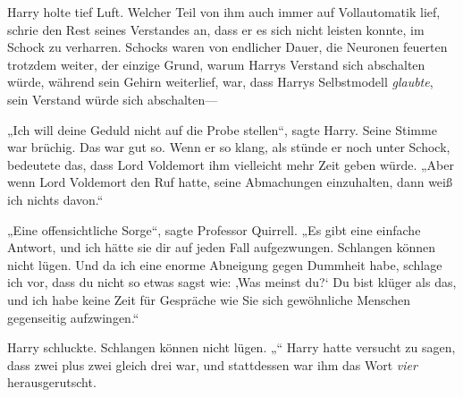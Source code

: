 Harry holte tief Luft. Welcher Teil von ihm auch immer auf Vollautomatik lief, schrie den Rest seines Verstandes an, dass er es sich nicht leisten konnte, im Schock zu verharren. Schocks waren von endlicher Dauer, die Neuronen feuerten trotzdem weiter, der einzige Grund, warum Harrys Verstand sich abschalten würde, während sein Gehirn weiterlief, war, dass Harrys Selbstmodell \emph{glaubte}, sein Verstand würde sich abschalten—

„Ich will deine Geduld nicht auf die Probe stellen“, sagte Harry.
Seine Stimme war brüchig. Das war gut so. Wenn er so klang, als stünde er noch unter Schock, bedeutete das, dass Lord Voldemort ihm vielleicht mehr Zeit geben würde.
„Aber wenn Lord Voldemort den Ruf hatte, seine Abmachungen einzuhalten, dann weiß ich nichts davon.“

„Eine offensichtliche Sorge“, sagte Professor Quirrell. „Es gibt eine einfache Antwort, und ich hätte sie dir auf jeden Fall aufgezwungen. Schlangen können nicht lügen. Und da ich eine enorme Abneigung gegen Dummheit habe, schlage ich vor, dass du nicht so etwas sagst wie: ‚Was meinst du?‘ Du bist klüger als das, und ich habe keine Zeit für Gespräche wie Sie sich gewöhnliche Menschen gegenseitig aufzwingen.“

Harry schluckte. Schlangen können nicht lügen. „“
Harry hatte versucht zu sagen, dass zwei plus zwei gleich drei war, und stattdessen war ihm das Wort \emph{vier} herausgerutscht.

